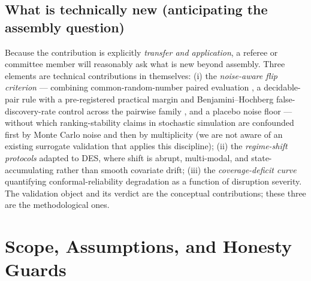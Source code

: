 \documentclass[12pt,a4paper]{article}
\begin{document}
\subsection{What is technically new (anticipating the assembly question)}

Because the contribution is explicitly \emph{transfer and application}, a referee or committee member will reasonably ask what is new beyond assembly. Three elements are technical contributions in themselves: (i) the \emph{noise-aware flip criterion} --- combining common-random-number paired evaluation \citep{law2015}, a decidable-pair rule with a pre-registered practical margin and Benjamini--Hochberg false-discovery-rate control across the pairwise family \citep{benjamini1995,benjamini2001}, and a placebo noise floor --- without which ranking-stability claims in stochastic simulation are confounded first by Monte Carlo noise and then by multiplicity (we are not aware of an existing surrogate validation that applies this discipline); (ii) the \emph{regime-shift protocols} adapted to DES, where shift is abrupt, multi-modal, and state-accumulating rather than smooth covariate drift; (iii) the \emph{coverage-deficit curve} quantifying conformal-reliability degradation as a function of disruption severity. The validation object and its verdict are the conceptual contributions; these three are the methodological ones.

\section{Scope, Assumptions, and Honesty Guards}
\end{document}
